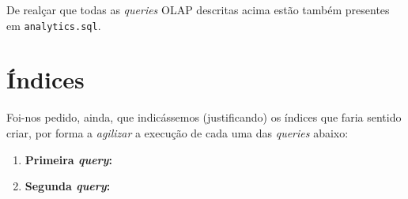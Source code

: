 \documentclass[12pt,a4paper]{article}
\begin{document}
  De realçar que todas as \textit{queries} OLAP descritas acima estão também
  presentes em \texttt{analytics.sql}.

  \section*{Índices}

  Foi-nos pedido, ainda, que indicássemos (justificando) os índices que faria sentido
  criar, por forma a \textit{agilizar} a execução de cada uma das \textit{queries} abaixo:

  \begin{enumerate}
    \item \textbf{Primeira \textit{query}:}
    
    

    \item \textbf{Segunda \textit{query}:}
  
    
  \end{enumerate}
  
\end{document}
